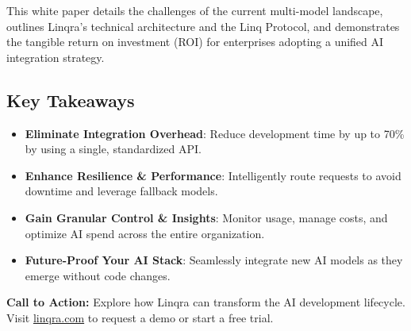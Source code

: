 \documentclass[11pt,a4paper]{article}
\begin{document}
This white paper details the challenges of the current multi-model landscape, outlines Linqra's technical architecture and the Linq Protocol, and demonstrates the tangible return on investment (ROI) for enterprises adopting a unified AI integration strategy.

\subsection*{Key Takeaways}
\begin{itemize}[leftmargin=1.8em]
  \item[\textcolor{linqraprimary}{\faIcon{tachometer-alt}}] \textbf{Eliminate Integration Overhead}: Reduce development time by up to 70\% by using a single, standardized API.
  \item[\textcolor{linqraprimary}{\faLifeRing}] \textbf{Enhance Resilience \& Performance}: Intelligently route requests to avoid downtime and leverage fallback models.
  \item[\textcolor{linqraprimary}{\faChartLine}] \textbf{Gain Granular Control \& Insights}: Monitor usage, manage costs, and optimize AI spend across the entire organization.
  \item[\textcolor{linqraprimary}{\faLayerGroup}] \textbf{Future-Proof Your AI Stack}: Seamlessly integrate new AI models as they emerge without code changes.
\end{itemize}

\begin{center}
\end{center}

\noindent\textbf{Call to Action:} Explore how Linqra can transform the AI development lifecycle. Visit \href{https://www.linqra.com}{linqra.com} to request a demo or start a free trial.
\end{document}
